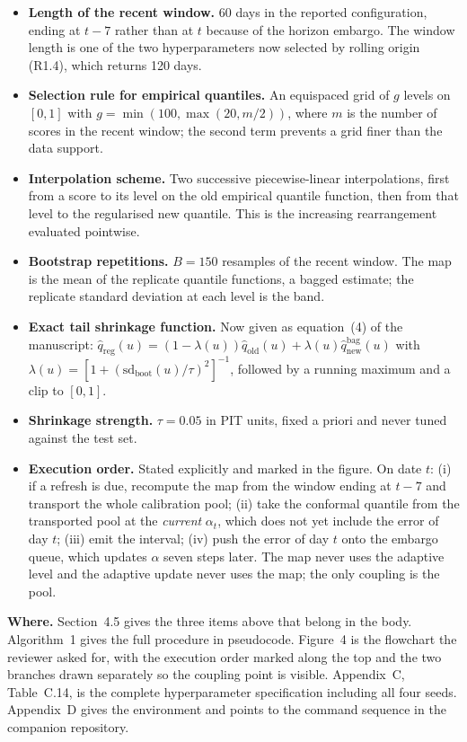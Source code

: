 \documentclass[11pt,a4paper]{article}
\newcommand{\where}[1]{\textbf{Where.} #1}
\begin{document}
\begin{itemize}[leftmargin=1.4em,itemsep=3pt]
\item \textbf{Length of the recent window.} 60 days in the reported configuration, ending at $t-7$ rather than at $t$ because of the horizon embargo. The window length is one of the two hyperparameters now selected by rolling origin (R1.4), which returns 120 days.
\item \textbf{Selection rule for empirical quantiles.} An equispaced grid of $g$ levels on $[0,1]$ with $g=\min(100,\max(20,m/2))$, where $m$ is the number of scores in the recent window; the second term prevents a grid finer than the data support.
\item \textbf{Interpolation scheme.} Two successive piecewise-linear interpolations, first from a score to its level on the old empirical quantile function, then from that level to the regularised new quantile. This is the increasing rearrangement evaluated pointwise.
\item \textbf{Bootstrap repetitions.} $B=150$ resamples of the recent window. The map is the mean of the replicate quantile functions, a bagged estimate; the replicate standard deviation at each level is the band.
\item \textbf{Exact tail shrinkage function.} Now given as equation~(4) of the manuscript: $\hat q_{\mathrm{reg}}(u)=(1-\lambda(u))\hat q_{\mathrm{old}}(u)+\lambda(u)\hat q^{\mathrm{bag}}_{\mathrm{new}}(u)$ with $\lambda(u)=[1+(\mathrm{sd}_{\mathrm{boot}}(u)/\tau)^2]^{-1}$, followed by a running maximum and a clip to $[0,1]$.
\item \textbf{Shrinkage strength.} $\tau=0.05$ in PIT units, fixed a priori and never tuned against the test set.
\item \textbf{Execution order.} Stated explicitly and marked in the figure. On date $t$: (i) if a refresh is due, recompute the map from the window ending at $t-7$ and transport the whole calibration pool; (ii) take the conformal quantile from the transported pool at the \emph{current} $\alpha_t$, which does not yet include the error of day $t$; (iii) emit the interval; (iv) push the error of day $t$ onto the embargo queue, which updates $\alpha$ seven steps later. The map never uses the adaptive level and the adaptive update never uses the map; the only coupling is the pool.
\end{itemize}

\where{Section~4.5 gives the three items above that belong in the body. Algorithm~1 gives the full procedure in pseudocode. Figure~4 is the flowchart the reviewer asked for, with the execution order marked along the top and the two branches drawn separately so the coupling point is visible. Appendix~C, Table~C.14, is the complete hyperparameter specification including all four seeds. Appendix~D gives the environment and points to the command sequence in the companion repository.}
\end{document}
